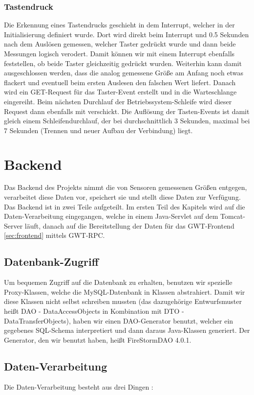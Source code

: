 \documentclass[12pt,a4paper,twoside]{article}
\begin{document}
\subsubsection{Tastendruck}
Die Erkennung eines Tastendrucks geschieht in dem Interrupt, welcher in der Initialisierung definiert wurde. Dort wird direkt beim Interrupt und 0.5 Sekunden nach dem Auslösen gemessen, welcher Taster gedrückt wurde und dann beide Messungen logisch verodert. Damit können wir mit einem Interrupt ebenfalls feststellen, ob beide Taster gleichzeitig gedrückt wurden. Weiterhin kann damit ausgeschlossen werden, dass die analog gemessene Größe am Anfang noch etwas flackert und eventuell beim ersten Auslesen den falschen Wert liefert. Danach wird ein GET-Request für das Taster-Event erstellt und in die Warteschlange eingereiht. Beim nächsten Durchlauf der Betriebssystem-Schleife wird dieser Request dann ebenfalls mit verschickt. Die Auflösung der Tasten-Events ist damit gleich einem Schleifendurchlauf, der bei durchschnittlich 3 Sekunden, maximal bei 7 Sekunden (Trennen und neuer Aufbau der Verbindung) liegt. 

\section{Backend}\label{sec:backend}
Das Backend des Projekts nimmt die von Sensoren gemessenen Größen entgegen, verarbeitet diese Daten vor, speichert sie und stellt diese Daten zur Verfügung. Das Backend ist in zwei Teile aufgeteilt. Im ersten Teil des Kapitels wird auf die Daten-Verarbeitung eingegangen, welche in einem Java-Servlet auf dem Tomcat-Server läuft, danach auf die Bereitstellung der Daten für das GWT-Frontend \ref{sec:frontend} mittels GWT-RPC.

\subsection{Datenbank-Zugriff}
Um bequemen Zugriff auf die Datenbank zu erhalten, benutzen wir spezielle Proxy-Klassen, welche die MySQL-Datenbank in Klassen abstrahiert. Damit wir diese Klassen nicht selbst schreiben mussten (das dazugehörige Entwurfsmuster heißt DAO - DataAccessObjects in Kombination mit DTO - DataTransferObjects), haben wir einen DAO-Generator benutzt, welcher ein gegebenes SQL-Schema interpretiert und dann daraus Java-Klassen generiert. Der Generator, den wir benutzt haben, heißt FireStormDAO 4.0.1.

\subsection{Daten-Verarbeitung}
Die Daten-Verarbeitung besteht aus drei Dingen : 
\end{document}
